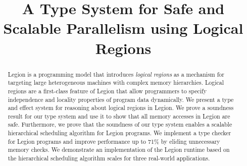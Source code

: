 \documentclass[9pt,nocopyrightspace,preprint]{sigplanconf}
\begin{document}
\title{A Type System for Safe and Scalable Parallelism using Logical Regions}
\maketitle

\begin{abstract}
Legion is a programming model that introduces 
{\em logical regions} as a mechanism for targeting large heterogeneous machines 
with complex memory hierarchies.  Logical regions are a first-class 
feature of Legion that allow programmers to specify independence 
and locality properties of program data dynamically.  We present
a type and effect system for reasoning about logical regions in Legion.  
We prove a soundness result for our type system and use it to show
that all memory accesses in Legion are safe.  Furthermore, we prove that
the soundness of our type system enables a scalable hierarchical
scheduling algorithm for Legion programs.  We implement a type checker
for Legion programs and improve performance up to 71\% by eliding
unnecessary memory checks.  We demonstrate an implementation of the Legion 
runtime based on the hierarchical scheduling algorithm scales for
three real-world applications.


\end{abstract}



%









{
\small

}
\end{document}

